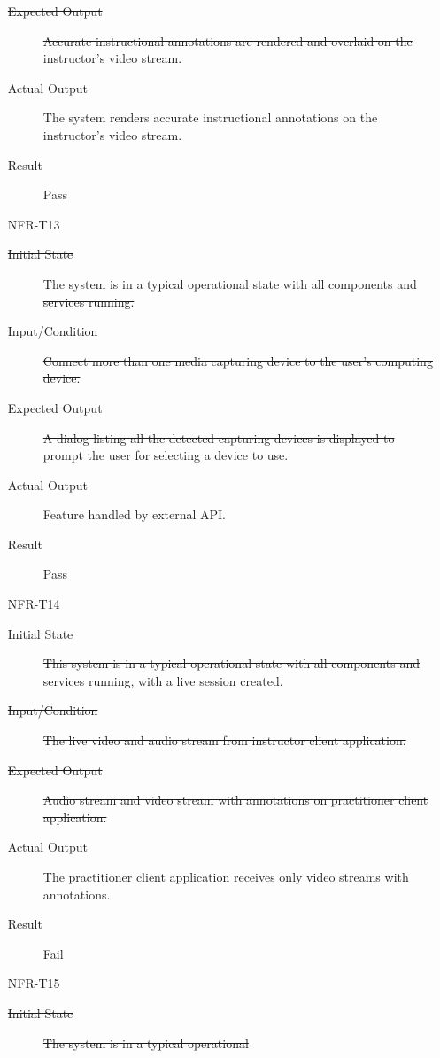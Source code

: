 \documentclass[12pt, titlepage]{article}
\begin{document}
\begin{enumerate}
\begin{description}
      \item[\sout{Expected Output}] \sout{Accurate instructional annotations are
          rendered and overlaid on the instructor’s video stream.}
      \item[Actual Output] The system renders accurate instructional annotations on
        the instructor’s video stream.
      \item[Result] Pass
      \end{description}
    \item[NFR-T13] \label{NFRT13}
      \begin{description}
      \item[\sout{Initial State}] \sout{The system is in a typical operational
          state with all components and services running.}
      \item[\sout{Input/Condition}] \sout{Connect more than one media capturing
          device to the user’s computing device.}
      \item[\sout{Expected Output}] \sout{A dialog listing all the detected
          capturing devices is displayed to prompt the user for selecting a
          device to use.}
      \item[Actual Output] Feature handled by external API.
      \item[Result] Pass
      \end{description}
    \item[NFR-T14] \label{NFRT14}
      \begin{description}
      \item[\sout{Initial State}] \sout{This system is in a typical operational
          state with all components and services running, with a live session
          created.}
      \item[\sout{Input/Condition}] \sout{The live video and audio stream from
          instructor client application.}
      \item[\sout{Expected Output}] \sout{Audio stream and video stream with
          annotations on practitioner client application.}
      \item[Actual Output] The practitioner client application receives only video
        streams with annotations.
      \item[Result] Fail
      \end{description}
    \item[NFR-T15] \label{NFRT15}
      \begin{description}
      \item[\sout{Initial State}] \sout{The system is in a typical operational
}
\end{description}
\end{enumerate}
\end{document}
